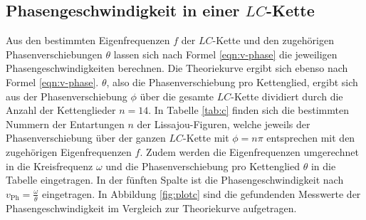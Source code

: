 \FloatBarrier
\subsection{Phasengeschwindigkeit in einer $LC$-Kette}

Aus den bestimmten Eigenfrequenzen $f$ der $LC$-Kette und den zugehörigen Phasenverschiebungen $\theta$ lassen sich nach Formel \eqref{eqn:v-phase} die jeweiligen Phasengeschwindigkeiten berechnen.
Die Theoriekurve ergibt sich ebenso nach Formel \eqref{eqn:v-phase}.
$\theta$, also die Phasenverschiebung pro Kettenglied, ergibt sich aus der Phasenverschiebung $\phi$ über die gesamte $LC$-Kette dividiert durch die Anzahl der Kettenglieder $n=14$.
In Tabelle \ref{tab:c} finden sich die bestimmten Nummern der Entartungen $n$ der Lissajou-Figuren, welche jeweils der Phasenverschiebung über der ganzen $LC$-Kette mit $\phi=n\pi$ entsprechen mit den zugehörigen Eigenfrequenzen $f$.
Zudem werden die Eigenfrequenzen umgerechnet in die Kreisfrequenz $\omega$ und die Phasenverschiebung pro Kettenglied $\theta$ in die Tabelle eingetragen.
In der fünften Spalte ist die Phasengeschwindigkeit nach $v_{\mathrm{Ph}}=\frac{\omega}{\theta}$ eingetragen.
In Abbildung \ref{fig:plotc} sind die gefundenden Messwerte der Phasengeschwindigkeit im Vergleich zur Theoriekurve aufgetragen.
